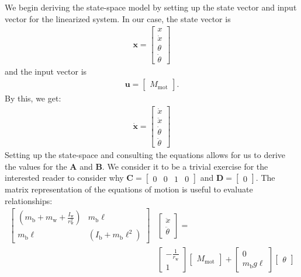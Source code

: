 \documentclass[journal]{IEEEtran}
\begin{document}
We begin deriving the state-space model by setting up the state vector and input vector for the linearized system. 
In our case, the state vector is
\begin{align}
    \mathbf{x} = \begin{bmatrix} x \\ \dot{x} \\ \theta \\ \dot{\theta} \end{bmatrix}
\end{align}
and the input vector is
\begin{align}
    \mathbf{u} = \begin{bmatrix} M_{\mathrm{mot}} \end{bmatrix}.
\end{align}
By this, we get:
\begin{align}
    \dot{\mathbf{x}} = \begin{bmatrix} \dot{x} \\ \ddot{x} \\ \dot{\theta} \\ \ddot{\theta} \end{bmatrix}
\end{align}
Setting up the state-space and consulting the equations allows for us to derive the values 
for the $\mathbf{A}$ and $\mathbf{B}$. We consider it to be a trivial exercise for 
the interested reader to consider why $\mathbf{C}=\begin{bmatrix}
    0 & 0 & 1 & 0
\end{bmatrix}
$ and $\mathbf{D}=\begin{bmatrix} 0 \end{bmatrix}$.
The matrix representation of the equations of motion is useful to evaluate relationships:
\begin{align}
    \begin{bmatrix}
        (m_{\mathrm{b}}+m_{\mathrm{w}}+\frac{I_{\mathrm{w}}}{r_{\mathrm{w}}^2}) & m_{\mathrm{b}}\ell \\
        m_{\mathrm{b}}\ell & (I_{\mathrm{b}}+m_{\mathrm{b}}\ell^2)
    \end{bmatrix}
    &\begin{bmatrix}
        \ddot{x} \\ \ddot{\theta}
    \end{bmatrix}
    = \\ &
    \begin{bmatrix}
        -\frac{1}{r_{\mathrm{w}}} \\ 1
    \end{bmatrix}
    \begin{bmatrix}
        M_{\mathrm{mot}}
    \end{bmatrix}
    +
    \begin{bmatrix}
        0 \\ m_{\mathrm{b}}g\ell
    \end{bmatrix}
    \begin{bmatrix}
        \theta 
    \end{bmatrix}
\end{align}
\end{document}
